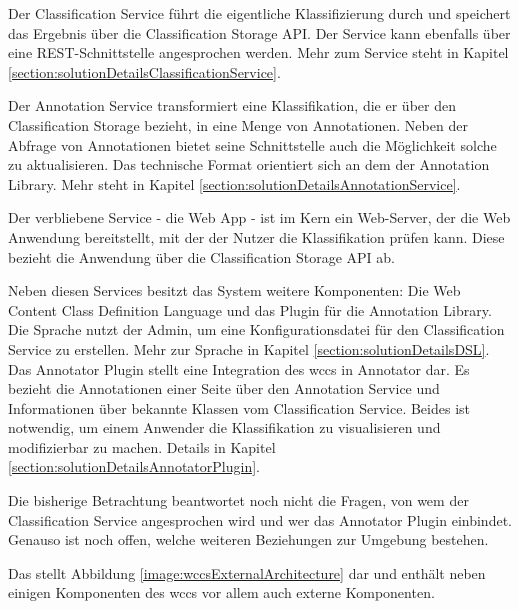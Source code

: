         Der Classification Service führt die eigentliche Klassifizierung durch
        und speichert das Ergebnis über die Classification Storage API.
        Der Service kann ebenfalls über eine REST-Schnittstelle angesprochen werden.
        Mehr zum Service steht in Kapitel \ref{section:solutionDetailsClassificationService}.

        Der Annotation Service transformiert eine Klassifikation,
        die er über den Classification Storage bezieht,
        in eine Menge von Annotationen.
        Neben der Abfrage von Annotationen bietet seine Schnittstelle auch
        die Möglichkeit solche zu aktualisieren.
        Das technische Format orientiert sich an dem der Annotation Library.
        Mehr steht in Kapitel \ref{section:solutionDetailsAnnotationService}.

        Der verbliebene Service - die Web App - ist im Kern ein Web-Server,
        der die Web Anwendung bereitstellt,
        mit der der Nutzer die Klassifikation prüfen kann.
        Diese bezieht die Anwendung über die Classification Storage API ab.

        Neben diesen Services besitzt das System weitere Komponenten:
        Die Web Content Class Definition Language und das Plugin für die
        Annotation Library.
        Die Sprache nutzt der Admin, um eine Konfigurationsdatei für den
        Classification Service zu erstellen.
        Mehr zur Sprache in Kapitel \ref{section:solutionDetailsDSL}.
        Das Annotator Plugin stellt eine Integration des \gls{wccs} in
        Annotator dar.
        Es bezieht die Annotationen einer Seite über den Annotation Service
        und Informationen über bekannte Klassen vom Classification Service.
        Beides ist notwendig, um einem Anwender die Klassifikation zu visualisieren
        und modifizierbar zu machen.
        Details in Kapitel \ref{section:solutionDetailsAnnotatorPlugin}.

        Die bisherige Betrachtung beantwortet noch nicht die Fragen,
        von wem der Classification Service angesprochen wird und wer das Annotator Plugin einbindet.
        Genauso ist noch offen, welche weiteren Beziehungen zur Umgebung bestehen.

        Das stellt Abbildung \ref{image:wccsExternalArchitecture} dar
        und enthält neben einigen Komponenten des \gls{wccs} vor allem auch
        externe Komponenten.

